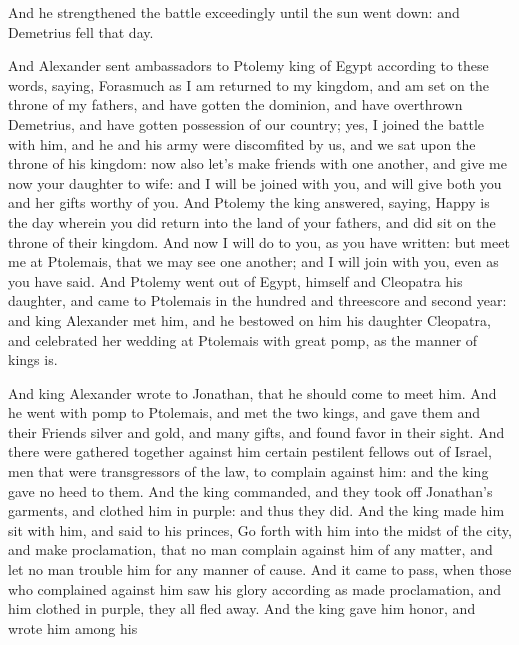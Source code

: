 {And he strengthened the battle exceedingly until the sun went down: and Demetrius fell that day.
\par }{\PP {}And Alexander sent ambassadors to Ptolemy king of Egypt according to these words, saying,
Forasmuch as I am returned to my kingdom, and am set on the throne of my fathers, and have gotten the dominion, and have overthrown Demetrius, and have gotten possession of our country;
yes, I joined the battle with him, and he and his army were discomfited by us, and we sat upon the throne of his kingdom:
now also let’s make friends with one another, and give me now your daughter to wife: and I will be joined with you, and will give both you and her gifts worthy of you.
And Ptolemy the king answered, saying, Happy is the day wherein you did return into the land of your fathers, and did sit on the throne of their kingdom.
And now I will do to you, as you have written: but meet me at Ptolemais, that we may see one another; and I will join with you, even as you have said.
And Ptolemy went out of Egypt, himself and Cleopatra his daughter, and came to Ptolemais in
 the hundred and threescore and second year:
and king Alexander met him, and he bestowed on him his daughter Cleopatra, and celebrated her wedding at Ptolemais with great pomp, as the manner of kings is.
\par }{\PP {}And king Alexander wrote to Jonathan, that he should come to meet him.
And he went with pomp to Ptolemais, and met the two kings, and gave them and their
 Friends silver and gold, and many gifts, and found favor in their sight.
And there were gathered together against him certain pestilent fellows out of Israel, men that were transgressors of the law, to complain against him: and the king gave no heed to them.
And the king commanded, and they took off Jonathan’s garments, and clothed him in purple: and thus they did.
And the king made him sit with him, and said to his princes, Go forth with him into the midst of the city, and make proclamation, that no man complain against him of any matter, and let no man trouble him for any manner of cause.
And it came to pass, when those who complained against him saw his glory according as
{} made proclamation, and
{} him clothed in purple, they all fled away.
And the king gave him honor, and wrote him among his
}

